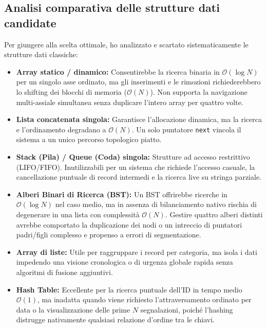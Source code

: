 \documentclass[12pt, a4paper]{article}
\begin{document}
\subsection{Analisi comparativa delle strutture dati candidate}
Per giungere alla scelta ottimale, ho analizzato e scartato sistematicamente le strutture dati classiche:
\begin{itemize}[leftmargin=*]
    \item \textbf{Array statico / dinamico:} Consentirebbe la ricerca binaria in $\mathcal{O}(\log N)$ per un singolo asse ordinato, ma gli inserimenti e le rimozioni richiederebbero lo shifting dei blocchi di memoria ($\mathcal{O}(N)$). Non supporta la navigazione multi-assiale simultanea senza duplicare l'intero array per quattro volte.
    \item \textbf{Lista concatenata singola:} Garantisce l'allocazione dinamica, ma la ricerca e l'ordinamento degradano a $\mathcal{O}(N)$. Un solo puntatore \texttt{next} vincola il sistema a un unico percorso topologico piatto.
    \item \textbf{Stack (Pila) / Queue (Coda) singola:} Strutture ad accesso restrittivo (LIFO/FIFO). Inutilizzabili per un sistema che richiede l'accesso casuale, la cancellazione puntuale di record intermedi e la ricerca live su stringa parziale.
    \item \textbf{Alberi Binari di Ricerca (BST):} Un BST offrirebbe ricerche in $\mathcal{O}(\log N)$ nel caso medio, ma in assenza di bilanciamento nativo rischia di degenerare in una lista con complessità $\mathcal{O}(N)$. Gestire quattro alberi distinti avrebbe comportato la duplicazione dei nodi o un intreccio di puntatori padri/figli complesso e propenso a errori di segmentazione.
    \item \textbf{Array di liste:} Utile per raggruppare i record per categoria, ma isola i dati impedendo una visione cronologica o di urgenza globale rapida senza algoritmi di fusione aggiuntivi.
    \item \textbf{Hash Table:} Eccellente per la ricerca puntuale dell'ID in tempo medio $\mathcal{O}(1)$, ma inadatta quando viene richiesto l'attraversamento ordinato per data o la visualizzazione delle prime $N$ segnalazioni, poiché l'hashing distrugge nativamente qualsiasi relazione d'ordine tra le chiavi.
\end{itemize}
\end{document}
